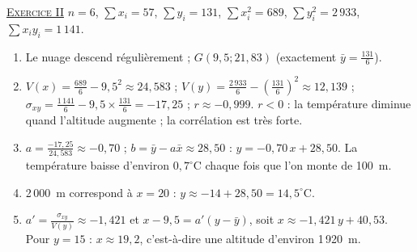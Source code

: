 \begin{corrige}
\noindent \underline{\textsc{Exercice II}} \newline
$n = 6$, $\sum x_i = 57$, $\sum y_i = 131$, $\sum x_i^2 = 689$, $\sum y_i^2 = 2\,933$, $\sum x_i y_i = 1\,141$.
\begin{enumerate}
\item Le nuage descend r\'eguli\`erement ; $G(9{,}5 ; 21{,}83)$ (exactement $\bar{y} = \frac{131}{6}$).
\item $V(x) = \frac{689}{6} - 9{,}5^2 \approx 24{,}583$ ; $V(y) = \frac{2\,933}{6} - \left(\frac{131}{6}\right)^2 \approx 12{,}139$ ;
      $\sigma_{xy} = \frac{1\,141}{6} - 9{,}5 \times \frac{131}{6} = -17{,}25$ ; $r \approx -0{,}999$.
      $r < 0$ : la temp\'erature diminue quand l'altitude augmente ; la corr\'elation est tr\`es forte.
\item $a = \frac{-17{,}25}{24{,}583} \approx -0{,}70$ ; $b = \bar{y} - a\bar{x} \approx 28{,}50$ : $\boxed{y = -0{,}70\,x + 28{,}50}$.
      La temp\'erature baisse d'environ $0{,}7^\circ$C chaque fois que l'on monte de 100~m.
\item 2\,000~m correspond \`a $x = 20$ : $y \approx -14 + 28{,}50 = 14{,}5^\circ$C.
\item $a' = \frac{\sigma_{xy}}{V(y)} \approx -1{,}421$ et $x - 9{,}5 = a'(y - \bar{y})$, soit $x \approx -1{,}421\,y + 40{,}53$.
      Pour $y = 15$ : $x \approx 19{,}2$, c'est-\`a-dire une altitude d'environ 1\,920~m.
\end{enumerate}


\end{corrige}

